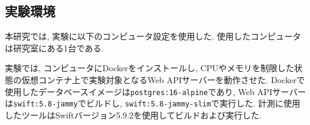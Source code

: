 \documentclass[../../../main]{subfiles}
\begin{document}
    \subsection{実験環境}\label{subsec:method-environment}

    本研究では, 実験に以下のコンピュータ設定を使用した. 使用したコンピュータは研究室にある1台である.

    

    実験では, コンピュータにDockerをインストールし, CPUやメモリを制限した状態の仮想コンテナ上で実験対象となるWeb APIサーバーを動作させた. Dockerで使用したデータベースイメージは\texttt{postgres:16-alpine}であり, Web APIサーバーは\texttt{swift:5.8-jammy}でビルドし, \texttt{swift:5.8-jammy-slim}で実行した. 計測に使用したツールはSwiftバージョン5.9.2を使用してビルドおよび実行した.
\end{document}
